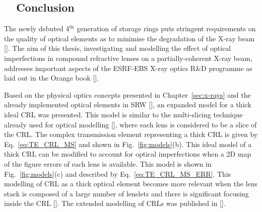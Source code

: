 \begin{refsection}\renewcommand{\thechapter}{7.en}
\chapter{~~Conclusion}\label{sec:conclusion_en}

The newly debuted 4$^\text{th}$ generation of storage rings puts stringent requirements on the quality of optical elements as to minimise the degradation of the X-ray beam [\cite{Schroer2014,Yabashi2014}]. The aim of this thesis, investigating and modelling the effect of optical imperfections in compound refractive lenses on a partially-coherent X-ray beam, addresses important aspects of the ESRF-EBS X-ray optics R$\&$D programme as laid out in the Orange book [\cite{orangebook}]. 

Based on the physical optics concepts presented in Chapter~\ref{sec:x-rays} and the already implemented optical elements in SRW [\cite{Baltser2011}], an expanded model for a thick ideal CRL was presented. This model is similar to the multi-slicing technique already used for optical modelling [\cite{Li2017,Ali2020}], where each lens is considered to be a slice of the CRL. The complex transmission element representing a thick CRL is given by Eq.~\ref{eq:TE_CRL_MS} and shown in Fig.~\ref{fig:models}(b). This ideal model of a thick CRL can be modified to account for optical imperfections when a 2D map of the figure errors of each lens is available. This model is shown in Fig.~\ref{fig:models}(c) and described by Eq.~\ref{eq:TE_CRL_MS_ERR}. This modelling of CRL as a thick optical element becomes more relevant when the lens stack is composed of a large number of lenslets and there is significant focusing inside the CRL [\cite{Schroer2005}]. The extended modelling of CRLs was published in [\cite{Celestre2020}].


\end{refsection}
